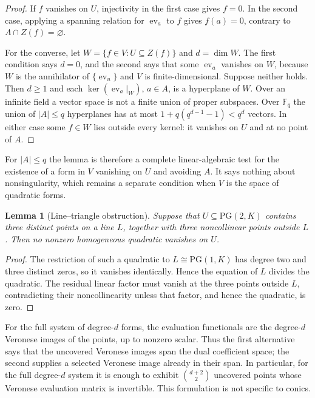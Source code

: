 \documentclass[11pt]{article}
\newtheorem{lemma}[theorem]{Lemma}
\theoremstyle{definition}
\theoremstyle{remark}
\newcommand{\PG}{\mathrm{PG}}
\newcommand{\F}{\mathbb{F}}
\begin{document}
\begin{proof}
If $f$ vanishes on $U$, injectivity in the first case gives $f=0$.  In the
second case, applying a spanning relation for $\operatorname{ev}_a$ to $f$
gives $f(a)=0$, contrary to $A\cap Z(f)=\varnothing$.

For the converse, let $W=\{f\in V:U\subseteq Z(f)\}$ and $d=\dim W$.  The
first condition says $d=0$, and the second says that some
$\operatorname{ev}_a$ vanishes on $W$, because $W$ is the annihilator of
$\{\operatorname{ev}_u\}$ and $V$ is finite-dimensional.  Suppose neither
holds.  Then $d\ge1$ and each $\ker(\operatorname{ev}_a|_W)$, $a\in A$, is
a hyperplane of $W$.  Over an infinite field a vector space is not a
finite union of proper subspaces.  Over $\F_q$ the union of $|A|\le q$
hyperplanes has at most $1+q(q^{d-1}-1)<q^d$ vectors.  In either case some
$f\in W$ lies outside every kernel: it vanishes on $U$ and at no point of
$A$.
\end{proof}

For $|A|\le q$ the lemma is therefore a complete linear-algebraic test for
the existence of a form in $V$ vanishing on $U$ and avoiding $A$.  It says
nothing about nonsingularity, which remains a separate condition when $V$
is the space of quadratic forms.

\begin{lemma}[Line--triangle obstruction]
\label{lem:line-triangle-obstruction}
Suppose that \(U\subseteq\PG(2,K)\) contains three distinct points on a
line \(L\), together with three noncollinear points outside \(L\).  Then no
nonzero homogeneous quadratic vanishes on \(U\).
\end{lemma}

\begin{proof}
The restriction of such a quadratic to \(L\cong\PG(1,K)\) has degree two
and three distinct zeros, so it vanishes identically.  Hence the equation
of \(L\) divides the quadratic.  The residual linear factor must vanish at
the three points outside \(L\), contradicting their noncollinearity unless
that factor, and hence the quadratic, is zero.
\end{proof}

For the full system of degree-$d$ forms, the evaluation functionals are the
degree-$d$ Veronese images of the points, up to nonzero scalar.  Thus the
first alternative says that the uncovered Veronese images span the dual
coefficient space; the second supplies a selected Veronese image already in
their span.  In particular, for the full degree-$d$ system it is enough to
exhibit $\binom{d+2}{2}$ uncovered points whose Veronese evaluation matrix is
invertible.  This formulation is not specific to conics.
\end{document}

